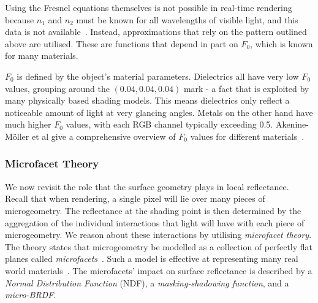 Using the Fresnel equations themselves is not possible in real-time rendering because \begin{math}n_1\end{math} and \begin{math}n_2\end{math} must be known for all wavelengths of visible light, and this data is not available~\cite{SchlickApproximation}. Instead, approximations that rely on the pattern outlined above are utilised. These are functions that depend in part on \begin{math}F_0\end{math}, which is known for many materials.

\begin{math}F_0\end{math} is defined by the object's material parameters. Dielectrics all have very low \begin{math}F_0\end{math} values, grouping around the \begin{math}(0.04, 0.04, 0.04)\end{math} mark - a fact that is exploited by many physically based shading models. This means dielectrics only reflect a noticeable amount of light at very glancing angles. Metals on the other hand have much higher \begin{math}F_0\end{math} values, with each RGB channel typically exceeding 0.5. Akenine-M\"{o}ller et al give a comprehensive overview of \begin{math}F_0\end{math} values for different materials~\cite{RTR4}.

\subsubsection{Microfacet Theory} \label{MicrofacetTheory}

We now revisit the role that the surface geometry plays in local reflectance. Recall that when rendering, a single pixel will lie over many pieces of microgeometry. The reflectance at the shading point is then determined by the aggregation of the individual interactions that light will have with each piece of microgeometry. We reason about these interactions by utilising \textit{microfacet theory}. The theory states that microgeometry be modelled as a collection of perfectly flat planes called \textit{microfacets}~\cite{BlinnModelsOfLightReflection}. Such a model is effective at representing many real world materials~\cite{ExperimentalAnalysisOfBRDF}. The microfacets' impact on surface reflectance is described by a \textit{Normal Distribution Function} (NDF), a \textit{masking-shadowing function}, and a \textit{micro-BRDF}.

